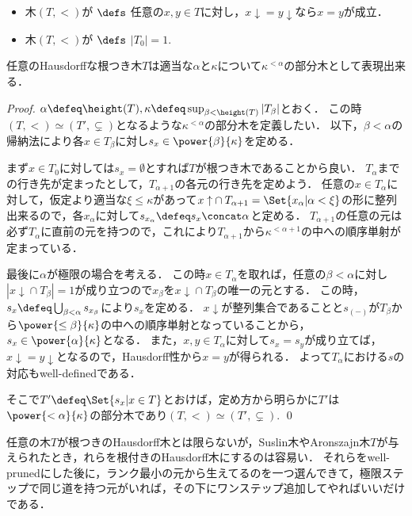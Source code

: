 \documentclass[a4j]{ltjsarticle}
\renewcommand{\emph}[1]{\textsf{\textgt{#1}}}
\begin{document}
\begin{definition}
 \begin{itemize}
  \item 木$(T, <)$が\emph{Hausdorff} $\defs$ 任意の$x, y \in T$に対し，$\mathord{x\downarrow} = \mathord{y \downarrow}$なら$x = y$が成立．
  \item 木$(T, <)$が\emph{根つき木} $\defs$ $|T_0| = 1$.
 \end{itemize}
\end{definition}
\begin{lemma}
 任意のHausdorffな根つき木$T$は適当な$\alpha$と$\kappa$について$\kappa^{<\alpha}$の部分木として表現出来る．
\end{lemma}
\begin{proof}
 $\alpha \defeq \height(T), \kappa \defeq \sup_{\beta < \height(T)} |T_\beta|$とおく．
 この時$(T, <) \simeq (T', \subsetneq)$となるような$\kappa^{<\alpha}$の部分木を定義したい．
 以下，$\beta < \alpha$の帰納法により各$x \in T_\beta$に対し$s_x \in \power{\beta}{\kappa}$を定める．

 まず$x \in T_0$に対しては$s_x = \emptyset$とすれば$T$が根つき木であることから良い．
 $T_\alpha$までの行き先が定まったとして，$T_{\alpha+1}$の各元の行き先を定めよう．
 任意の$x \in T_{\alpha}$に対して，仮定より適当な$\xi \leq \kappa$があって$\mathord{x \uparrow} \cap T_{\alpha+1} = \Set{ x_\alpha | \alpha < \xi}$の形に整列出来るので，各$x_\alpha$に対して$s_{x_\alpha} \defeq s_x \concat \alpha$と定める．
 $T_{\alpha+1}$の任意の元は必ず$T_\alpha$に直前の元を持つので，これにより$T_{\alpha+1}$から$\kappa^{<\alpha+1}$の中への順序単射が定まっている．

 最後に$\alpha$が極限の場合を考える．
 この時$x \in T_\alpha$を取れば，任意の$\beta < \alpha$に対し$|\mathord{x \downarrow} \cap T_\beta| = 1$が成り立つので$x_\beta$を$\mathord{x \downarrow} \cap T_\beta$の唯一の元とする．
 この時，$s_x \defeq \bigcup_{\beta < \alpha} s_{x_\beta}$により$s_x$を定める．
 $x\downarrow$が整列集合であることと$s_{(-)}$が$T_\beta$から$\power{\leq\beta}{\kappa}$の中への順序単射となっていることから，$s_x \in \power{\alpha}{\kappa}$となる．
 また，$x, y \in T_\alpha$に対して$s_x = s_y$が成り立てば，$\mathord{x \downarrow} = \mathord{y \downarrow}$となるので，Hausdorff性から$x = y$が得られる．
 よって$T_\alpha$における$s$の対応もwell-definedである．

 そこで$T' \defeq \Set{ s_x | x \in T}$とおけば，定め方から明らかに$T'$は$\power{<\alpha}{\kappa}$の部分木であり$(T, <) \simeq (T', \subsetneq)$. \qed
\end{proof}

任意の木$T$が根つきのHausdorff木とは限らないが，Suslin木やAronszajn木$T$が与えられたとき，れらを根付きのHausdorff木にするのは容易い．
それらをwell-prunedにした後に，ランク最小の元から生えてるのを一つ選んできて，極限ステップで同じ道を持つ元がいれば，その下にワンステップ追加してやればいいだけである．
\nocite{Shelah:1984,Kunen:1980,Jech:2002}
\nocite{Bekkali:1991bv,Miyazaki:2013fv,Kunen:2011}
\printbibliography[title=参考文献]
\end{document}
